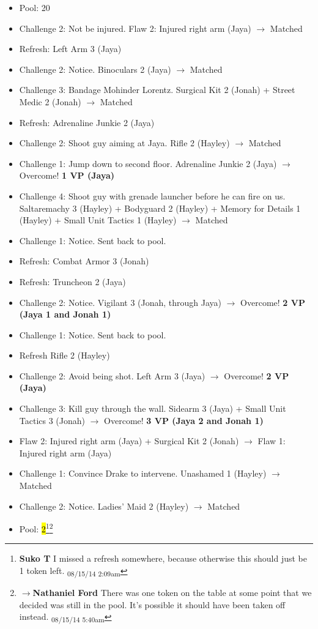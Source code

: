 \begin{itemize}
\item Pool: 20
\item Challenge 2: Not be injured.  Flaw 2: Injured right arm (Jaya) $\rightarrow$ Matched
\item Refresh: Left Arm 3 (Jaya)
\item Challenge 2: Notice.  Binoculars 2 (Jaya) $\rightarrow$ Matched
\item Challenge 3: Bandage Mohinder Lorentz.  Surgical Kit 2 (Jonah) + Street Medic 2 (Jonah) $\rightarrow$ Matched
\item Refresh: Adrenaline Junkie 2 (Jaya)
\item Challenge 2: Shoot guy aiming at Jaya. Rifle 2 (Hayley) $\rightarrow$ Matched
\item Challenge 1: Jump down to second floor.  Adrenaline Junkie 2 (Jaya)  $\rightarrow$ Overcome! \textbf{1 VP (Jaya)}
\item Challenge 4: Shoot guy with grenade launcher before he can fire on us.  Saltaremachy 3 (Hayley) + Bodyguard 2 (Hayley) + Memory for Details 1 (Hayley) + Small Unit Tactics 1 (Hayley) $\rightarrow$ Matched
\item Challenge 1: Notice. Sent back to pool.
\item Refresh: Combat Armor 3 (Jonah)
\item Refresh: Truncheon 2 (Jaya)
\item Challenge 2: Notice.  Vigilant 3 (Jonah, through Jaya) $\rightarrow$ Overcome! \textbf{2 VP (Jaya 1 and Jonah 1)}
\item Challenge 1: Notice.  Sent back to pool.
\item Refresh Rifle 2 (Hayley)
\item Challenge 2:  Avoid being shot.  Left Arm 3 (Jaya) $\rightarrow$ Overcome! \textbf{2 VP (Jaya)}
\item Challenge 3: Kill guy through the wall.  Sidearm 3 (Jaya) + Small Unit Tactics 3 (Jonah)  $\rightarrow$ Overcome! \textbf{3 VP (Jaya 2 and Jonah 1)}
\item Flaw 2: Injured right arm (Jaya) + Surgical Kit 2 (Jonah) $\rightarrow$  {\color[RGB]{255,0,0}Flaw 1: Injured right arm (Jaya)} 
\item Challenge 1: Convince Drake to intervene.  Unashamed 1 (Hayley) $\rightarrow$ Matched
\item Challenge 2: Notice.  Ladies' Maid 2 (Hayley) $\rightarrow$ Matched
\item Pool: \hl{2}\footnote{\textbf{Suko T }I missed a refresh somewhere, because otherwise this should just be 1 token left. \textsubscript{08/15/14 2:09am}}\footnote{$\rightarrow$\textbf{Nathaniel Ford }There was one token on the table at some point that we decided was still in the pool. It's possible it should have been taken off instead. \textsubscript{08/15/14 5:40am}}
\end{itemize}


